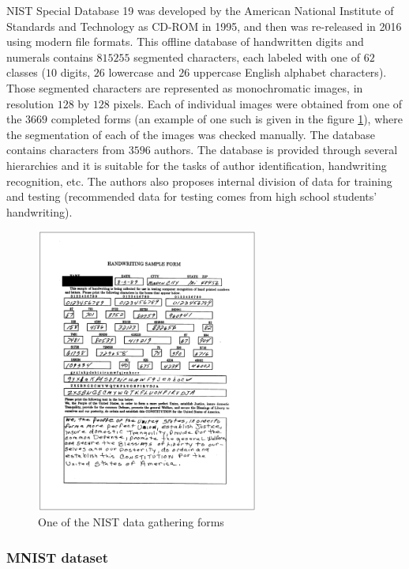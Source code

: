 \documentclass[eng]{simposium}
\begin{document}
NIST Special Database 19 \cite{12}\cite{13} was developed by the American National Institute of Standards and Technology as CD-ROM in 1995, and then was 
re-released in 2016 using modern file formats. 
This offline database of handwritten digits and numerals contains $815255$ segmented characters, each labeled 
with one of $62$ classes ($10$ digits, $26$ lowercase and $26$ uppercase English alphabet characters). 
Those segmented characters are represented as monochromatic images, in resolution $128$ by $128$ pixels. 
Each of individual images were obtained from one of the $3669$ completed forms (an example of one such is given in the figure \ref{fig:nist}), 
where the segmentation of each of the images was checked manually. 
The database contains characters from $3596$ authors. 
The database is provided through several hierarchies and it is suitable for the tasks of author identification, handwriting recognition, etc. 
The authors also proposes internal division of data for training and testing 
(recommended data for testing comes from high school students' handwriting). 

\begin{figure}[!ht]
  \centering
  \includegraphics[width=0.65\textwidth]{nist.png}
  \caption{One of the NIST data gathering forms \cite{9}}
  \label{fig:nist}
\end{figure}

\subsubsection{MNIST dataset}
\end{document}
